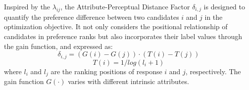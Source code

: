 Inspired by the \(\lambda_{ij}\), the Attribute-Perceptual Distance Factor \(\delta_{i,j}\) is designed to quantify the preference difference between two candidates \(i\) and \(j\) in the optimization objective. It not only considers the positional relationship of candidates in preference ranks but also incorporates their label values through the gain function, and expressed as:
\begin{equation}
    \delta_{i,j} = (G(i) - G(j)) \cdot \left( T(i) - T(j) \right) 
\end{equation}
\begin{equation}
    T(i) = 1/log(l_i+1)
\end{equation}
where \(l_i\) and \(l_j\) are the ranking positions of response \(i\) and \(j\), respectively. 
The gain function \(G(\cdot)\) varies with different intrinsic attributes.


